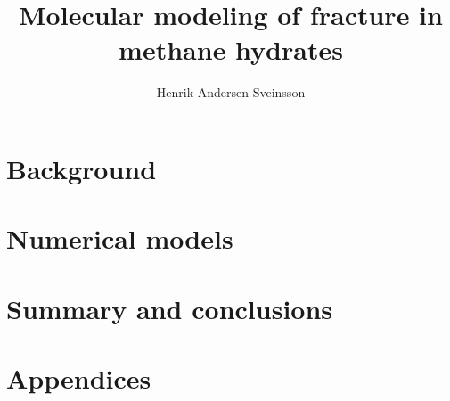 \documentclass[twoside, english, a4paper, 11pt]{uiofysmaster}
\title{Molecular modeling of fracture in methane hydrates}
\author{Henrik Andersen Sveinsson}
\begin{document}
\maketitle




\tableofcontents

\setcounter{page}{11}




\part{Background}






\part{Numerical models}





\part{Summary and conclusions}


\part{Appendices}
\appendix





\end{document}
